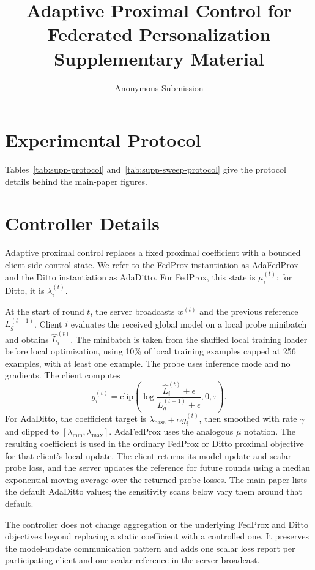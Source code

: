 \documentclass[letterpaper]{article}
\title{Adaptive Proximal Control for Federated Personalization\\Supplementary Material}
\author{
    Anonymous Submission
}
\begin{document}
\maketitle

\section{Experimental Protocol}

Tables~\ref{tab:supp-protocol} and~\ref{tab:supp-sweep-protocol}
give the protocol details behind the main-paper figures.

\section{Controller Details}

Adaptive proximal control replaces a fixed proximal coefficient with a
bounded client-side control state. We refer to the FedProx instantiation
as AdaFedProx and the Ditto instantiation as AdaDitto. For FedProx, this
state is $\mu_i^{(t)}$; for Ditto, it is $\lambda_i^{(t)}$.

At the start of round $t$, the server broadcasts $w^{(t)}$ and the
previous reference $L_g^{(t-1)}$. Client $i$ evaluates the received
global model on a local probe minibatch and obtains $\hat L_i^{(t)}$.
The minibatch is taken from the shuffled local training loader before
local optimization, using 10\% of local training examples capped at
256 examples, with at least one example. The probe uses inference mode
and no gradients. The client computes
\[
g_i^{(t)}=\mathrm{clip}\left(\log\frac{\hat L_i^{(t)}+\epsilon}{L_g^{(t-1)}+\epsilon},0,\tau\right).
\]
For AdaDitto, the coefficient target is
$\lambda_{\mathrm{base}}+\alpha g_i^{(t)}$, then smoothed with rate
$\gamma$ and clipped to $[\lambda_{\min},\lambda_{\max}]$. AdaFedProx
uses the analogous $\mu$ notation. The resulting coefficient is used in
the ordinary FedProx or Ditto proximal objective for that client's local
update. The client returns its model update and scalar probe loss, and
the server updates the reference for future rounds using a median
exponential moving average over the returned probe losses. The main
paper lists the default AdaDitto values; the sensitivity scans below
vary them around that default.

The controller does not change aggregation or the underlying FedProx and
Ditto objectives beyond replacing a static coefficient with a controlled
one. It preserves the model-update communication pattern and adds one
scalar loss report per participating client and one scalar reference in
the server broadcast.
\end{document}
